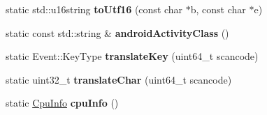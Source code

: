 \begin{DoxyCompactItemize}
\item 
\hypertarget{class_tempest_1_1_system_a_p_i_ac6de15203642c24bc7cfdf30edcaa33a}{static std\+::u16string {\bfseries to\+Utf16} (const char $\ast$b, const char $\ast$e)}\label{class_tempest_1_1_system_a_p_i_ac6de15203642c24bc7cfdf30edcaa33a}

\item 
\hypertarget{class_tempest_1_1_system_a_p_i_af089e5eda2978ff0b1142fea2a57b509}{static const std\+::string \& {\bfseries android\+Activity\+Class} ()}\label{class_tempest_1_1_system_a_p_i_af089e5eda2978ff0b1142fea2a57b509}

\item 
\hypertarget{class_tempest_1_1_system_a_p_i_a31366b7fc290af5b28f40ba30297c491}{static Event\+::\+Key\+Type {\bfseries translate\+Key} (uint64\+\_\+t scancode)}\label{class_tempest_1_1_system_a_p_i_a31366b7fc290af5b28f40ba30297c491}

\item 
\hypertarget{class_tempest_1_1_system_a_p_i_a563ecfb28c2208cb1be4f29156967559}{static uint32\+\_\+t {\bfseries translate\+Char} (uint64\+\_\+t scancode)}\label{class_tempest_1_1_system_a_p_i_a563ecfb28c2208cb1be4f29156967559}

\item 
\hypertarget{class_tempest_1_1_system_a_p_i_ac729fc1ee0786fa41f57b059037fb73d}{static \hyperlink{struct_tempest_1_1_system_a_p_i_1_1_cpu_info}{Cpu\+Info} {\bfseries cpu\+Info} ()}\label{class_tempest_1_1_system_a_p_i_ac729fc1ee0786fa41f57b059037fb73d}

\end{DoxyCompactItemize}
